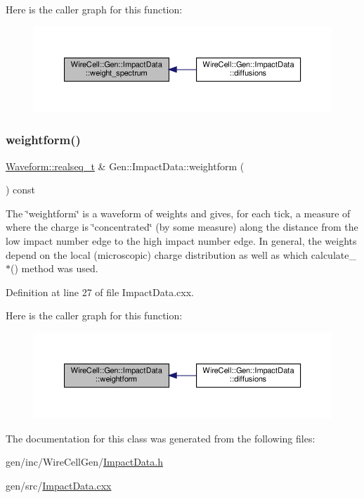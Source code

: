 Here is the caller graph for this function\+:
\nopagebreak
\begin{figure}[H]
\begin{center}
\leavevmode
\includegraphics[width=350pt]{class_wire_cell_1_1_gen_1_1_impact_data_a81cef30a2ec41d8b63f07267506582d1_icgraph}
\end{center}
\end{figure}
\mbox{\label{class_wire_cell_1_1_gen_1_1_impact_data_a8a2ccedf08eab6acee300809308ef216}} 
\subsubsection{\texorpdfstring{weightform()}{weightform()}}
{\footnotesize\ttfamily \hyperlink{namespace_wire_cell_1_1_waveform_a479175e541c8545e87cd8063b74b6956}{Waveform\+::realseq\+\_\+t} \& Gen\+::\+Impact\+Data\+::weightform (\begin{DoxyParamCaption}{ }\end{DoxyParamCaption}) const}

The \char`\"{}weightform\char`\"{} is a waveform of weights and gives, for each tick, a measure of where the charge is \char`\"{}concentrated\char`\"{} (by some measure) along the distance from the low impact number edge to the high impact number edge. In general, the weights depend on the local (microscopic) charge distribution as well as which {\ttfamily calculate\+\_\+$\ast$()} method was used. 

Definition at line 27 of file Impact\+Data.\+cxx.

Here is the caller graph for this function\+:
\nopagebreak
\begin{figure}[H]
\begin{center}
\leavevmode
\includegraphics[width=350pt]{class_wire_cell_1_1_gen_1_1_impact_data_a8a2ccedf08eab6acee300809308ef216_icgraph}
\end{center}
\end{figure}


The documentation for this class was generated from the following files\+:\begin{DoxyCompactItemize}
\item 
gen/inc/\+Wire\+Cell\+Gen/\hyperlink{_impact_data_8h}{Impact\+Data.\+h}\item 
gen/src/\hyperlink{_impact_data_8cxx}{Impact\+Data.\+cxx}\end{DoxyCompactItemize}
